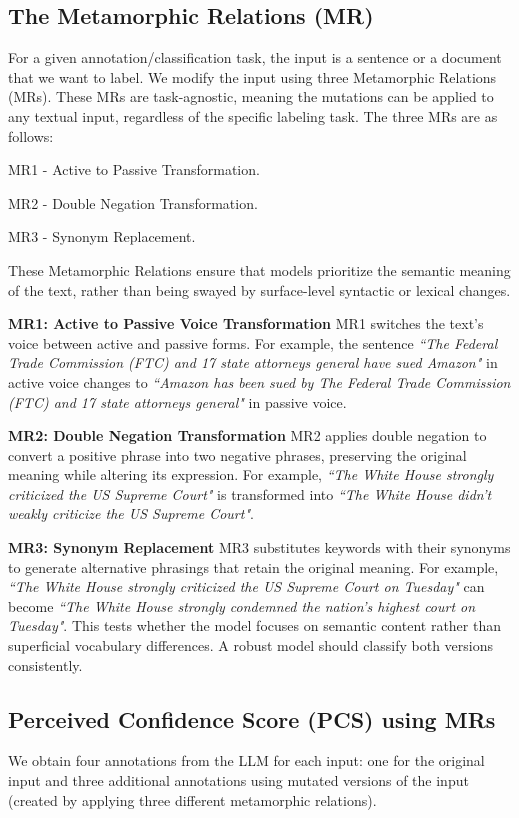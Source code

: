 \subsection{The Metamorphic Relations (MR)}
\label{MR}
For a given annotation/classification task, the input is a sentence or a document that we want to label.  We modify the input using three Metamorphic Relations (MRs). These MRs are task-agnostic, meaning the mutations can be applied to any textual input, regardless of the specific labeling task. The three MRs are as follows:
\begin{inparaenum}[(1)]%
    \item MR1 - Active to Passive Transformation.  
    \item MR2 - Double Negation Transformation.
    \item MR3 - Synonym Replacement.
\end{inparaenum}
These Metamorphic Relations ensure that models prioritize the semantic meaning of the text, rather than being swayed by surface-level syntactic or lexical changes.


\noindent \textbf{MR1: Active to Passive Voice Transformation}
MR1 switches the text’s voice between active and passive forms. For example, the sentence \textit{``The Federal Trade Commission (FTC) and 17 state attorneys general have sued Amazon"} in active voice changes to \textit{``Amazon has been sued by The Federal Trade Commission (FTC) and 17 state attorneys general"} in passive voice. 


\noindent \textbf{MR2: Double Negation Transformation}
MR2 applies double negation to convert a positive phrase into two negative phrases, preserving the original meaning while altering its expression. For example, \textit{``The White House strongly criticized the US Supreme Court"} is transformed into \textit{``The White House didn’t weakly criticize the US Supreme Court"}. 

\noindent \textbf{MR3: Synonym Replacement}
MR3 substitutes keywords with their synonyms to generate alternative phrasings that retain the original meaning. For example, \textit{``The White House strongly criticized the US Supreme Court on Tuesday"} can become \textit{``The White House strongly condemned the nation's highest court on Tuesday"}. This tests whether the model focuses on semantic content rather than superficial vocabulary differences. A robust model should classify both versions consistently.


\subsection {Perceived Confidence Score (PCS) using MRs}
\label{PCS}
We obtain four annotations from the LLM for each input: one for the original input and three additional annotations using mutated versions of the input (created by applying three different metamorphic relations). 
 
